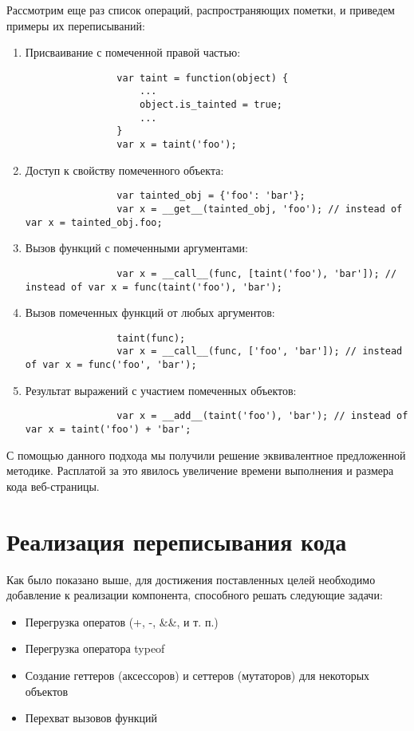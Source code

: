 	Рассмотрим еще раз список операций, распространяющих пометки, и приведем примеры их переписываний:
	\begin{enumerate}
		\item Присваивание с помеченной правой частью:
			\begin{lstlisting}
				var taint = function(object) {
					...
					object.is_tainted = true;
					...
				}
				var x = taint('foo');
			\end{lstlisting}
		\item Доступ к свойству помеченного объекта: 
			\begin{lstlisting}
				var tainted_obj = {'foo': 'bar'}; 
				var x = __get__(tainted_obj, 'foo'); // instead of var x = tainted_obj.foo; 
			\end{lstlisting}
		\item Вызов функций с помеченными аргументами:
			\begin{lstlisting}
				var x = __call__(func, [taint('foo'), 'bar']); // instead of var x = func(taint('foo'), 'bar');
			\end{lstlisting}
		\item Вызов помеченных функций от любых аргументов:
			\begin{lstlisting}
				taint(func);
				var x = __call__(func, ['foo', 'bar']); // instead of var x = func('foo', 'bar');
			\end{lstlisting}
		\item Результат выражений с участием помеченных объектов:
			\begin{lstlisting}
				var x = __add__(taint('foo'), 'bar'); // instead of var x = taint('foo') + 'bar';
			\end{lstlisting}
	\end{enumerate}

	С помощью данного подхода мы получили решение эквивалентное предложенной методике. Расплатой за это явилось увеличение времени выполнения и размера кода веб-страницы.

\section{Реализация переписывания кода}
Как было показано выше, для достижения поставленных целей необходимо добавление к реализации компонента, способного решать следующие задачи:

\begin{itemize}
	\item Перегрузка оператов (+, -, \&\&, и т. п.)
	\item Перегрузка оператора typeof
	\item Создание геттеров (аксессоров) и сеттеров (мутаторов) для некоторых объектов
	\item Перехват вызовов функций
\end{itemize}



